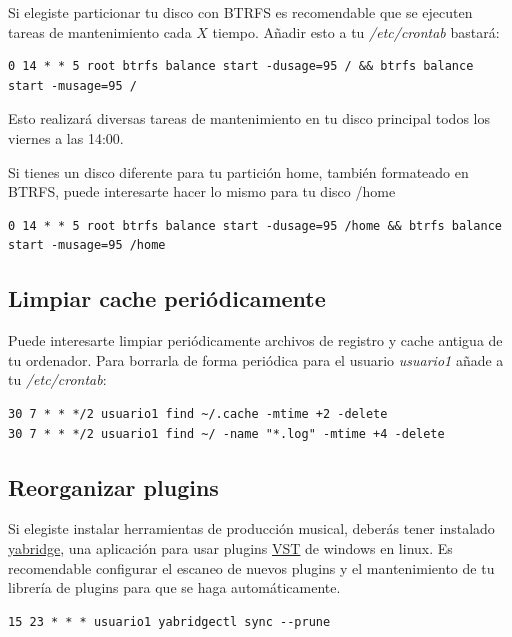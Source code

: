 \documentclass[12pt]{article}
\begin{document}
Si elegiste particionar tu disco con BTRFS es recomendable que se ejecuten tareas de mantenimiento cada $X$ tiempo. Añadir esto a tu \emph{/etc/crontab} bastará:

\begin{lstlisting}[basicstyle=\scriptsize\ttfamily]
0 14 * * 5 root btrfs balance start -dusage=95 / && btrfs balance start -musage=95 /
\end{lstlisting}

Esto realizará diversas tareas de mantenimiento en tu disco principal todos los viernes a las 14:00.

Si tienes un disco diferente para tu partición home, también formateado en BTRFS, puede interesarte hacer lo mismo para tu disco /home

\begin{lstlisting}[basicstyle=\scriptsize\ttfamily]
0 14 * * 5 root btrfs balance start -dusage=95 /home && btrfs balance start -musage=95 /home
\end{lstlisting}

\subsection{Limpiar cache periódicamente}

Puede interesarte limpiar periódicamente archivos de registro y cache antigua de tu ordenador. Para borrarla de forma periódica para el usuario \emph{usuario1} añade a tu \emph{/etc/crontab}:

\begin{verbatim}
30 7 * * */2 usuario1 find ~/.cache -mtime +2 -delete
30 7 * * */2 usuario1 find ~/ -name "*.log" -mtime +4 -delete
\end{verbatim}

\subsection{Reorganizar plugins}

Si elegiste instalar herramientas de producción musical, deberás tener instalado \href{https://github.com/robbert-vdh/yabridge}{yabridge}, una aplicación para usar plugins \href{https://es.wikipedia.org/wiki/Virtual_Studio_Technology}{VST} de windows en linux. Es recomendable configurar el escaneo de nuevos plugins y el mantenimiento de tu librería de plugins para que se haga automáticamente.

\begin{verbatim}
15 23 * * * usuario1 yabridgectl sync --prune
\end{verbatim}
\end{document}
